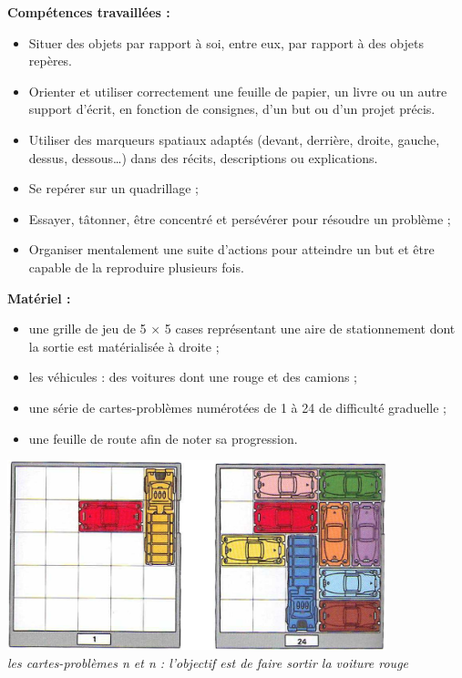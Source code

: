 \begin{exercice*}
{\bf Compétences travaillées :}
\begin{itemize}
   \item Situer des objets par rapport à soi, entre eux, par rapport à des objets repères.
   \item Orienter et utiliser correctement une feuille de papier, un livre ou un autre support d’écrit, en fonction de consignes, d’un but ou d’un projet précis.
    \item Utiliser des marqueurs spatiaux adaptés (devant, derrière, droite, gauche, dessus, dessous\dots) dans des récits, descriptions ou explications.
   \item Se repérer sur un quadrillage ;
   \item Essayer, tâtonner, être concentré et persévérer pour résoudre un problème ;
   \item Organiser mentalement une suite d'actions pour atteindre un but et être capable de la reproduire plusieurs fois. \\
\end{itemize}

{\bf Matériel :}
\begin{itemize} 
    \item une grille de jeu de 5 $\times$ 5 cases représentant une aire de stationnement dont la sortie est matérialisée à droite ;
    \item les véhicules : des voitures dont une rouge et des camions ;
    \item une série de cartes-problèmes numérotées de 1 à 24 de difficulté graduelle ;
   \item une feuille de route afin de noter sa progression. \\
\end{itemize}

\begin{center}
   \includegraphics[width=11cm]{Nombres_et_calculs_did/Images/Num2_activites_cartes} \\
   {\it les cartes-problèmes n et n : l'objectif est de faire sortir la voiture rouge}
\end{center}


\end{exercice*}
